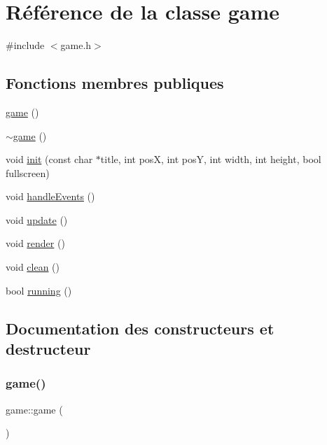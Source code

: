 \hypertarget{classgame}{}\section{Référence de la classe game}
\label{classgame}


{\ttfamily \#include $<$game.\+h$>$}

\subsection*{Fonctions membres publiques}
\begin{DoxyCompactItemize}
\item 
\hyperlink{classgame_ad9c102127b5038f880067ad6c9198d38}{game} ()
\item 
\hyperlink{classgame_ae87abd20c4d8a7906fa48e690a5f1d07}{$\sim$game} ()
\item 
void \hyperlink{classgame_a10ab3c1529405984fa5406e2cf96c511}{init} (const char $\ast$title, int posX, int posY, int width, int height, bool fullscreen)
\item 
void \hyperlink{classgame_a8fedf23a5fe4329f1f05758e26d58319}{handle\+Events} ()
\item 
void \hyperlink{classgame_a2be7307eb3c9065fc7c728edd68d0a78}{update} ()
\item 
void \hyperlink{classgame_aabb612769a8b4d11248f97a758bf48fa}{render} ()
\item 
void \hyperlink{classgame_a88b3caa9482e0223501490e19476bd0a}{clean} ()
\item 
bool \hyperlink{classgame_aac32f595b4b5b8c36ea594badcbbde85}{running} ()
\end{DoxyCompactItemize}


\subsection{Documentation des constructeurs et destructeur}
\mbox{\label{classgame_ad9c102127b5038f880067ad6c9198d38}} 
\subsubsection{\texorpdfstring{game()}{game()}}
{\footnotesize\ttfamily game\+::game (\begin{DoxyParamCaption}{ }\end{DoxyParamCaption})}

